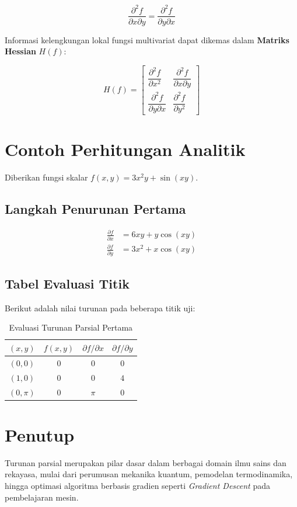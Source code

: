 \documentclass[11pt,a4paper]{article}
\begin{document}
\begin{equation}
    \frac{\partial^2 f}{\partial x \partial y} = \frac{\partial^2 f}{\partial y \partial x}
\end{equation}

Informasi kelengkungan lokal fungsi multivariat dapat dikemas dalam \textbf{Matriks Hessian} $H(f)$:

\begin{equation}
    H(f) = \begin{bmatrix}
        \dfrac{\partial^2 f}{\partial x^2} & \dfrac{\partial^2 f}{\partial x \partial y} \\[1em]
        \dfrac{\partial^2 f}{\partial y \partial x} & \dfrac{\partial^2 f}{\partial y^2}
    \end{bmatrix}
\end{equation}

\section{Contoh Perhitungan Analitik}
Diberikan fungsi skalar $f(x, y) = 3x^2y + \sin(xy)$.

\subsection{Langkah Penurunan Pertama}
\begin{align}
    \frac{\partial f}{\partial x} &= 6xy + y\cos(xy) \\
    \frac{\partial f}{\partial y} &= 3x^2 + x\cos(xy)
\end{align}

\subsection{Tabel Evaluasi Titik}
Berikut adalah nilai turunan pada beberapa titik uji:

\begin{table}[ht]
\centering
\caption{Evaluasi Turunan Parsial Pertama}
\label{tab:evaluasi}
\begin{tabular}{cccc}
\toprule
$(x, y)$ & $f(x,y)$ & $\partial f / \partial x$ & $\partial f / \partial y$ \\
\midrule
$(0, 0)$ & $0$ & $0$ & $0$ \\
$(1, 0)$ & $0$ & $0$ & $4$ \\
$(0, \pi)$ & $0$ & $\pi$ & $0$ \\
\bottomrule
\end{tabular}
\end{table}

\section{Penutup}
Turunan parsial merupakan pilar dasar dalam berbagai domain ilmu sains dan rekayasa, mulai dari perumusan mekanika kuantum, pemodelan termodinamika, hingga optimasi algoritma berbasis gradien seperti \textit{Gradient Descent} pada pembelajaran mesin.




\end{document}
